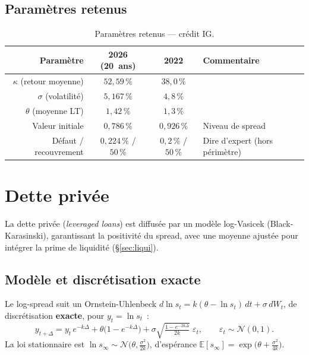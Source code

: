 \documentclass[11pt,a4paper]{article}
\newcommand{\tablehead}[1]{{\sffamily\bfseries\color{nxnavy}#1}}
\begin{document}
\subsection{Paramètres retenus}
\begin{table}[H]
\centering\small
\renewcommand{\arraystretch}{1.4}\setlength{\tabcolsep}{6pt}
\begin{tabularx}{\linewidth}{R c c >{\raggedright\arraybackslash}p{3.4cm}}
\toprule
\tablehead{Paramètre} & \tablehead{2026 (20~ans)} & \tablehead{2022} & \tablehead{Commentaire} \\
\midrule
{} $\kappa$ (retour moyenne) & $52{,}59\,\%$ & $38{,}0\,\%$ & \\
$\sigma$ (volatilité) & $5{,}167\,\%$ & $4{,}8\,\%$ & \\
 $\theta$ (moyenne LT) & $1{,}42\,\%$ & $1{,}3\,\%$ & \\
Valeur initiale & $0{,}786\,\%$ & $0{,}926\,\%$ & Niveau de spread \\
 Défaut / recouvrement & $0{,}224\,\%$ / $50\,\%$ & $0{,}2\,\%$ / $50\,\%$ & Dire d'expert (hors périmètre) \\
\bottomrule
\end{tabularx}
\caption{Paramètres retenus --- crédit IG.}
\end{table}

\clearpage
\section{Dette privée}
La dette privée (\emph{leveraged loans}) est diffusée par un modèle log-Vasicek (Black-Karasinski), garantissant la positivité du spread, avec une moyenne ajustée pour intégrer la prime de liquidité (\S\ref{sec:liqui}).

\subsection{Modèle et discrétisation exacte}
\begin{definitionbox}
Le log-spread suit un Ornstein-Uhlenbeck $d\ln s_t=k(\theta-\ln s_t)\,dt+\sigma\,dW_t$, de discrétisation \textbf{exacte}, pour $y_t=\ln s_t$~:
\[
y_{t+\Delta}=y_t\,e^{-k\Delta}+\theta\big(1-e^{-k\Delta}\big)+\sigma\sqrt{\tfrac{1-e^{-2k\Delta}}{2k}}\;\varepsilon_t,\qquad \varepsilon_t\sim\mathcal N(0,1).
\]
La loi stationnaire est $\ln s_\infty\sim\mathcal N\!\big(\theta,\tfrac{\sigma^2}{2k}\big)$, d'espérance $\mathbb E[s_\infty]=\exp\!\big(\theta+\tfrac{\sigma^2}{4k}\big)$.
\end{definitionbox}
\end{document}
